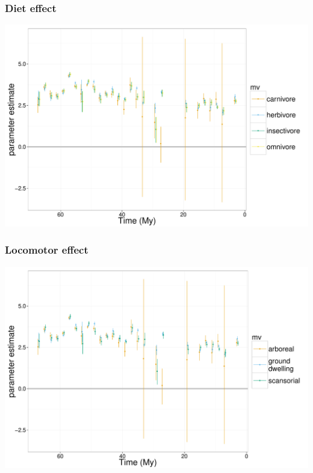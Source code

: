 \documentclass{beamer}
\begin{document}
\begin{frame}
  \frametitle{Diet effect}
  \begin{center}
    \includegraphics[height = 0.8\textheight, width = \textwidth,  keepaspectratio = true]{figure/diet_est_time}
  \end{center}
\end{frame}

\begin{frame}
  \frametitle{Locomotor effect}
  \begin{center}
    \includegraphics[height = 0.8\textheight, width = \textwidth,  keepaspectratio = true]{figure/loco_est_time}
  \end{center}
\end{frame}
\end{document}
